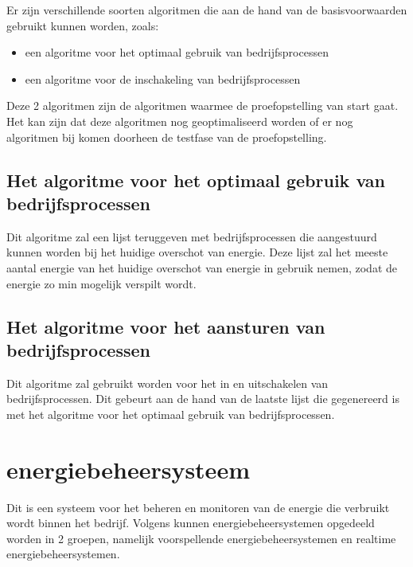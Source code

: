 Er zijn verschillende soorten algoritmen die aan de hand van de basisvoorwaarden gebruikt kunnen worden, zoals:

\begin{itemize}
    \item een algoritme voor het optimaal gebruik van bedrijfsprocessen
    \item een algoritme voor de inschakeling van bedrijfsprocessen
\end{itemize}

Deze 2 algoritmen zijn de algoritmen waarmee de proefopstelling van start gaat. Het kan zijn dat deze algoritmen nog geoptimaliseerd worden of er nog algoritmen bij komen doorheen de testfase van de proefopstelling.

\subsection{Het algoritme voor het optimaal gebruik van bedrijfsprocessen}
\label{sec:stand-van-zaken-algoritme-optimaal}

Dit algoritme zal een lijst teruggeven met bedrijfsprocessen die aangestuurd kunnen worden bij het huidige overschot van energie. Deze lijst zal het meeste aantal energie van het huidige overschot van energie in gebruik nemen, zodat de energie zo min mogelijk verspilt wordt.

\subsection{Het algoritme voor het aansturen van bedrijfsprocessen}
\label{sec:stand-van-zaken-algoritme-aansturen}

Dit algoritme zal gebruikt worden voor het in en uitschakelen van bedrijfsprocessen. Dit gebeurt aan de hand van de laatste lijst die gegenereerd is met het algoritme voor het optimaal gebruik van bedrijfsprocessen.

\section{energiebeheersysteem}
\label{sec:stand-van-zaken-energiebeheersysteem}

Dit is een systeem voor het beheren en monitoren van de energie die verbruikt wordt binnen het bedrijf. Volgens \textcite{FALOPE2024} kunnen energiebeheersystemen opgedeeld worden in 2 groepen, namelijk voorspellende energiebeheersystemen en realtime energiebeheersystemen.\\

